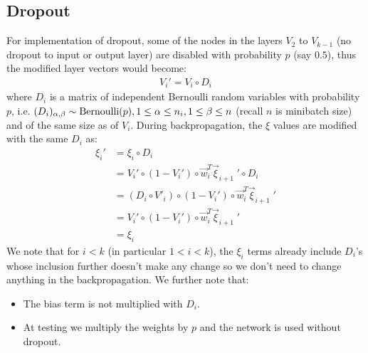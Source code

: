 \documentclass{article}
\begin{document}
\subsection{Dropout}
For implementation of dropout, some of the nodes in the layers $V_2$ to $V_{k-1}$ (no dropout to input or output layer) are disabled with probability $p$ (say $0.5$), thus the modified layer vectors would become:
\begin{gather*}
V_i'=V_i\circ D_i\tag{$1<i<k$}
\end{gather*}
where $D_i$ is a matrix of independent Bernoulli random variables with probability $p$, i.e. $(D_i)_{\alpha,\beta}\sim{\rm Bernoulli}(p), 1\le \alpha \le n_i, 1\le \beta \le n$ (recall $n$ is minibatch size) and of the same size as of $V_i$. During backpropagation, the $\xi$ values are modified with the same $D_i$ as:
\begin{align*}
\xi_i'&=\xi_i\circ D_i \\&= V_i' \circ (1-V_i') \circ \vec w_i^T\vec \xi_{i+1}\;'\circ D_i\\\tag{$1<i<k$}
&=(D_i\circ V'_i)\circ (1-V_i') \circ \vec w_i^T\vec \xi_{i+1}\;'\\
&=V_i'\circ (1-V_i') \circ \vec w_i^T\vec \xi_{i+1}\;'\\
&=\xi_i
\end{align*}
We note that for $i<k$ (in particular $1<i<k$), the $\xi_i$ terms already include $D_i$'s whose inclusion further doesn't make any change so we don't need to change anything in the backpropagation. We further note that:
\begin{itemize}
\item The bias term is not multiplied with $D_i$.
\item At testing we multiply the weights by $p$ and the network is used without dropout.
\end{itemize}
\end{document}
